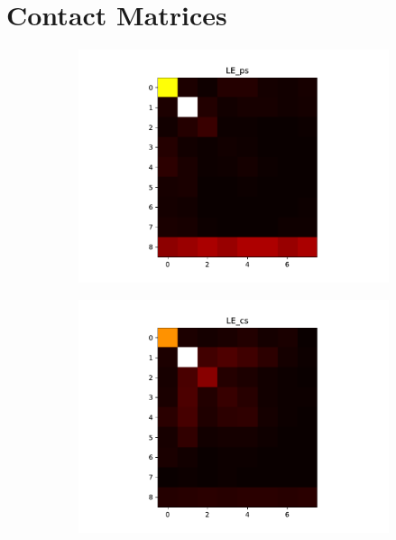 \section{Contact Matrices}

\begin{figure}[H]
\centering
\begin{subfigure}{0.48\textwidth}
\includegraphics[width = \textwidth]{../fig/heatmap_LE_ps.pdf}
\end{subfigure}
\begin{subfigure}{0.48\textwidth}
\includegraphics[width = \textwidth]{../fig/heatmap_LE_cs.pdf}
\end{subfigure}
\begin{subfigure}{0.48\textwidth}

\end{subfigure}
\end{figure}
